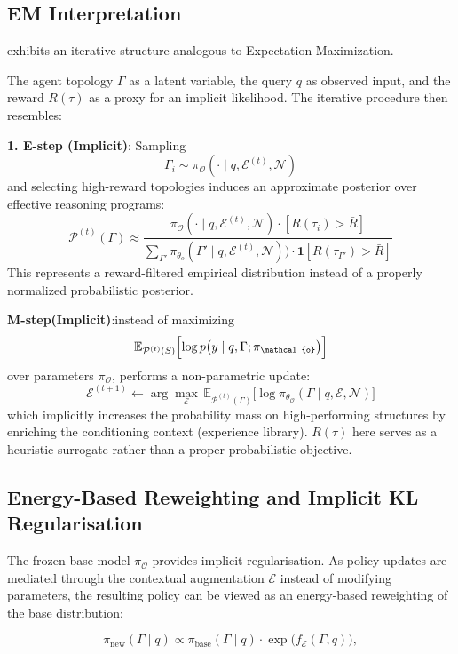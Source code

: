 \subsection{EM Interpretation}
\hero exhibits an iterative structure analogous to Expectation-Maximization. 

The agent topology $\Gamma$ as a latent variable, the query $q$ as observed input, and the reward $R(\tau)$ as a proxy for an implicit likelihood. The iterative procedure then resembles:

\medskip
\noindent\textbf{1. E-step (Implicit)}: Sampling 
\[
\Gamma_{i} \sim {\pi_\mathcal{O}}(\cdot \mid q, \mathcal{E}^{(t)}, \mathcal{N})
\] 
and selecting high-reward topologies induces an approximate posterior over effective reasoning programs:
\[
\mathcal{P}^{(t)}(\Gamma) \approx 
\frac{\pi_{\mathcal{O}}(\cdot \mid q, \mathcal{E}^{(t)}, \mathcal{N}) \cdot \mathbf{}[R(\tau_i) > \bar{R}]}%
{\sum_{\Gamma'} \pi_{\theta_o}(\Gamma' \mid q, \mathcal{E}^{(t)}, \mathcal{N})) \cdot \mathbf{1}[R(\tau_{\Gamma'}) > \bar{R}]}
\]
This represents a reward-filtered empirical distribution instead of a properly normalized probabilistic posterior.

\noindent\textbf{M-step(Implicit)}:instead of maximizing
\[
\mathbb{E}_{\mathcal{P}^{(t)}(S)} \Bigl[ \log p\bigl(y \mid q, \Gamma; \pi_{\mathcal{o}} \bigr) \Bigr]
\]
over parameters $\pi_{\mathcal{O}}$, \hero performs a non-parametric update:
\[
\mathcal{E}^{(t+1)} \leftarrow 
\arg\max_{\mathcal{E}} \, 
\mathbb{E}_{\mathcal{P}^{(t)}(\Gamma)} \bigl[\log \pi_{\theta_\mathcal{O}}(\Gamma \mid q, \mathcal{E}, \mathcal{N})\bigr]
\]
which implicitly increases the probability mass on high-performing structures by enriching the conditioning context (experience library).
$R(\tau)$ here serves as a heuristic surrogate rather than a proper probabilistic objective.


\subsection{Energy-Based Reweighting and Implicit KL Regularisation}

The frozen base model $\pi_{\mathcal{O}}$ provides implicit regularisation. As policy updates are mediated through the contextual augmentation $\mathcal{E}$ instead of modifying parameters, the resulting policy can be viewed as an energy-based reweighting of the base distribution:

\[
\pi_{\text{new}}(\Gamma \mid q) \propto \pi_{\text{base}}(\Gamma \mid q) \cdot \exp\bigl(f_{\mathcal{E}}(\Gamma, q)\bigr),
\]

